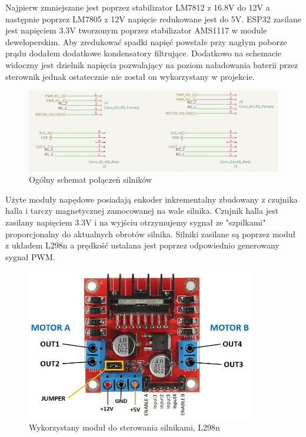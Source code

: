 Najpierw zmniejszane jest poprzez stabilizator LM7812 z 16.8V do 12V a następnie poprzez LM7805 z 12V napięcie redukowane jest do 5V. 
ESP32 zasilane jest napięciem 3.3V tworzonym poprzez stabilizator AMS1117 w module deweloperskim. 
Aby zredukować spadki napięć powstałe przy nagłym poborze prądu dodałem dodatkowe kondensatory filtrujące. 
Dodatkowo na schemacie widoczny jest dzielnik napięcia pozwalający na poziom naładowania baterii przez sterownik 
jednak ostatecznie nie został on wykorzystany w projekcie.
\begin{figure}[H]
	\centering
	\includegraphics[width=16cm]{pages/robot/zdjecia/kicad/schematSilniki.png}
	\caption{Ogólny schemat połączeń silników}
	\label{Fig:Rysunek}
\end{figure}
Użyte moduły napędowe posiadają enkoder inkrementalny zbudowany z czujnika halla i tarczy magnetycznej zamocowanej na wale silnika.
Czujnik halla jest zasilany napięciem 3.3V i na wyjściu otrzymujemy sygnał ze "szpilkami" proporcjonalny do aktualnych obrotów silnika. 
Silniki zasilane są poprzez moduł z układem L298n a prędkość ustalana jest poprzez odpowiednio generowany sygnał PWM. 
\begin{figure}[H]
	\centering
	\includegraphics[width=10cm]{pages/robot/zdjecia/l298n_modul.jpg}
	\caption{Wykorzystany moduł do sterowania silnikami, L298n}
	\label{Fig:Rysunek}
\end{figure}
